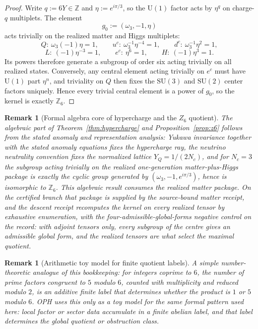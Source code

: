 \documentclass[11pt]{article}
\newtheorem{remark}[theorem]{Remark}
\newcommand{\SU}{\mathrm{SU}}
\newcommand{\U}{\mathrm{U}}
\begin{document}
\begin{proof}
Write $q:=6Y\in\mathbb Z$ and $\eta:=e^{i\pi/3}$, so the $\U(1)$ factor acts by $\eta^q$ on charge-$q$ multiplets. The element
\[
g_0:=(\omega_3,-1,\eta)
\]
acts trivially on the realized matter and Higgs multiplets:
\[
Q:\ \omega_3(-1)\eta=1,\qquad
u^c:\ \omega_3^{-1}\eta^{-4}=1,\qquad
d^c:\ \omega_3^{-1}\eta^2=1,
\]
\[
L:\ (-1)\eta^{-3}=1,\qquad
e^c:\ \eta^6=1,\qquad
H:\ (-1)\eta^3=1.
\]
Its powers therefore generate a subgroup of order six acting trivially on all realized states. Conversely, any central element acting trivially on $e^c$ must have $\U(1)$ part $\eta^n$, and triviality on $Q$ then fixes the $\SU(3)$ and $\SU(2)$ center factors uniquely. Hence every trivial central element is a power of $g_0$, so the kernel is exactly $\mathbb Z_6$.
\end{proof}

\begin{remark}[Formal algebra core of hypercharge and the \(Z_6\) quotient]
\label{rem:formal-hypercharge-z6-core}
The algebraic part of Theorem~\ref{thm:hypercharge} and
Proposition~\ref{prop:z6} follows from the stated anomaly and representation analysis: Yukawa invariance together
with the stated anomaly equations fixes the hypercharge ray, the neutrino
neutrality convention fixes the normalized lattice \(Y_Q=1/(2N_c)\), and for
\(N_c=3\) the subgroup acting trivially on the realized one-generation
matter-plus-Higgs package is exactly the cyclic group generated by
\((\omega_3,-1,e^{i\pi/3})\), hence is isomorphic to \(\mathbb Z_6\).
This algebraic result consumes the realized matter package. On the certified
branch that package is supplied by the source-bound matter receipt, and the
descent receipt recomputes the kernel on every realized tensor by exhaustive
enumeration, with the four-admissible-global-forms negative control on the
record: with adjoint tensors only, every subgroup of the centre gives an
admissible global form, and the realized tensors are what select the maximal
quotient.
\end{remark}

\begin{remark}[Arithmetic toy model for finite quotient labels]
A simple number-theoretic analogue of this
bookkeeping: for integers coprime to \(6\), the number of prime factors
congruent to \(5\) modulo \(6\), counted with multiplicity and reduced modulo \(2\), is an
additive finite label that determines whether the product is \(1\) or \(5\) modulo \(6\). OPH uses
this only as a toy model for the same formal pattern used
here: local factor or sector data accumulate in a finite abelian label, and that label determines
the global quotient or obstruction class.
\end{remark}
\end{document}
